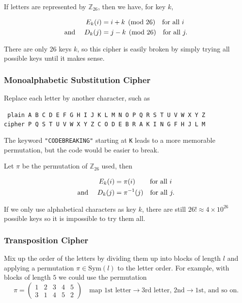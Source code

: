 \documentclass{article}
\begin{document}
If letters are represented by $\mathbb{Z}_{26}$, then we have, for key $k$,

\begin{align*}
    E_{k}(i) &= i+k \pmod{26} \text{\quad for all } i\\
    \text{and \quad} D_{k}(j) &= j-k \pmod{26} \text{\quad for all } j.\\
\end{align*}

There are only 26 keys $k$, so this cipher is easily broken by simply trying all possible keys until it makes sense.

\subsubsection{Monoalphabetic Substitution Cipher}

Replace each letter by another character, such as

\begin{center}
    \texttt{
         plain \quad A B C D E F G H I J K L M N O P Q R S T U V W X Y Z\\
        cipher \quad P Q S T U V W X Y Z C O D E B R A K I N G F H J L M
    }
\end{center}

The keyword \texttt{"CODEBREAKING"} starting at \texttt{K} leads to a more memorable permutation, but the code would be easier to break.

Let $\pi$ be the permutation of $\mathbb{Z}_{26}$ used, then

\begin{align*}
    E_{k}(i) &= \pi(i) \text{\quad\quad \,for all } i\\
    \text{and \quad} D_{k}(j) &= \pi^{-1}(j) \text{\quad for all } j.\\
\end{align*}

If we only use alphabetical characters as key $k$, there are still $26! \approx 4 \times 10^{26}$ possible keys so it is impossible to try them all.

\subsubsection{Transposition Cipher}

Mix up the order of the letters by dividing them up into blocks of length $l$ and applying a permutation $\pi \in \mathrm{Sym}(l)$ to the letter order. For example, with blocks of length $5$ we could use the permutation
    \[\pi = 
    \begin{pmatrix}
        1 &2 &3 &4 &5\\
        3 &1 &4 &5 &2
    \end{pmatrix}
    \quad
    \text{map 1st letter} \to \text{3rd letter, 2nd} \to \text{1st, and so on.}
    \]
\end{document}
